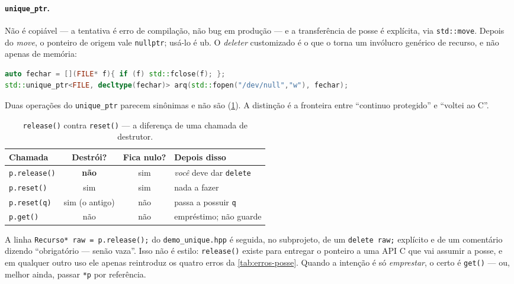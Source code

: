 \paragraph{\texttt{unique\_ptr}.} Não é copiável --- a tentativa é erro de
compilação, não bug em produção --- e a transferência de posse é explícita, via
\texttt{std::move}. Depois do \emph{move}, o ponteiro de origem vale
\texttt{nullptr}; usá-lo é \gls{ub}. O \emph{deleter} customizado é o que o
torna um invólucro genérico de recurso, e não apenas de memória:

\begin{lstlisting}[style=bt, language=C++,
    caption={\texttt{unique\_ptr} como guarda de qualquer recurso
             (\texttt{demo\_unique.hpp}, seção 1.5).}]
auto fechar = [](FILE* f){ if (f) std::fclose(f); };
std::unique_ptr<FILE, decltype(fechar)> arq(std::fopen("/dev/null","w"), fechar);
\end{lstlisting}

Duas operações do \texttt{unique\_ptr} parecem sinônimas e não são
(\cref{tab:release-reset}). A distinção é a fronteira entre ``continuo
protegido'' e ``voltei ao C''.

\begin{table}[htbp]
\centering
\caption{\texttt{release()} contra \texttt{reset()} --- a diferença de uma
         chamada de destrutor.}
\label{tab:release-reset}
\footnotesize
\begin{tabular}{@{}lccl@{}}
\toprule
\textbf{Chamada} & \textbf{Destrói?} & \textbf{Fica nulo?} & \textbf{Depois disso} \\
\midrule
\texttt{p.release()} & \textbf{não} & sim & \emph{você} deve dar \texttt{delete} \\
\texttt{p.reset()}   & sim          & sim & nada a fazer \\
\texttt{p.reset(q)}  & sim (o antigo) & não & passa a possuir \texttt{q} \\
\texttt{p.get()}     & não          & não & empréstimo; não guarde \\
\bottomrule
\end{tabular}
\end{table}

\begin{armadilha}
A linha \texttt{Recurso* raw = p.release();} do \texttt{demo\_unique.hpp} é
seguida, no subprojeto, de um \texttt{delete raw;} explícito e de um comentário
dizendo ``obrigatório --- senão vaza''. Isso não é estilo: \texttt{release()}
existe para entregar o ponteiro a uma API C que vai assumir a posse, e em
qualquer outro uso ele apenas reintroduz os quatro erros da
\cref{tab:erros-posse}. Quando a intenção é só \emph{emprestar}, o certo é
\texttt{get()} --- ou, melhor ainda, passar \texttt{*p} por referência.
\end{armadilha}

